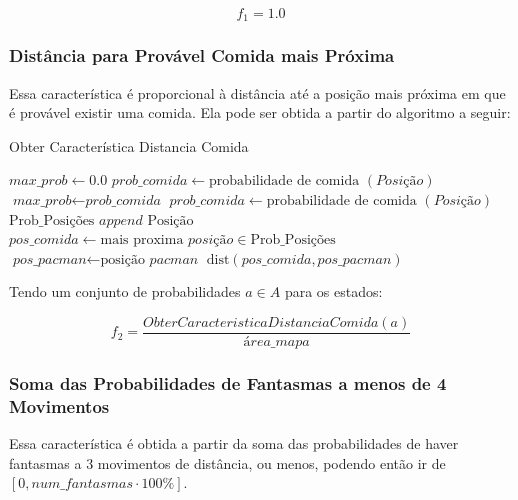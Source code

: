 $$ f_1 = 1.0 $$

\subsubsection*{Distância para Provável Comida mais Próxima} \label{subsubsection:DistProvavelComida}

Essa característica é proporcional à distância até a posição mais próxima em que é provável existir uma comida. Ela pode ser obtida a partir do algoritmo a seguir:

\begin{algorithm}[H]
	\caption{Obter Característica Distancia Comida} \label{algorithm:ObterCaracteristicaDistanciaComida}
	\begin{algorithmic}[1]
			\State $\textit{max\_prob} \gets 0.0 $
				\State $\textit{prob\_comida} \gets \text{probabilidade de comida } \left( \textit{Posição} \right) $
					\State $\textit{max\_prob} \gets \textit{prob\_comida} $
				\EndIf 
			\EndFor
				\State $\textit{prob\_comida} \gets \text{probabilidade de comida } \left( \textit{Posição} \right) $
					\State $ \text{Prob\_Posições } append \text{ Posição} $
				\EndIf 
			\EndFor
			\State $\textit{pos\_comida} \gets \text{mais proxima }\textit{posição} \in \text{Prob\_Posições} $
			\State $\textit{pos\_pacman} \gets \text{posição }\textit{pacman} $
			\State \Return $ \text{dist} \left( \textit{pos\_comida}, \textit{pos\_pacman} \right)  $
		\EndProcedure
	\end{algorithmic}
\end{algorithm}

Tendo um conjunto de probabilidades $ a \in A $ para os estados:

$$ f_2 = \frac{ObterCaracteristicaDistanciaComida \left( a \right)}{\textit{área\_mapa}} $$

\subsubsection*{Soma das Probabilidades de Fantasmas a menos de 4 Movimentos}

Essa característica é obtida a partir da soma das probabilidades de haver fantasmas a 3 movimentos de distância, ou menos, podendo então ir de $ \left[ 0, num\_fantasmas \cdot 100\% \right] $.

